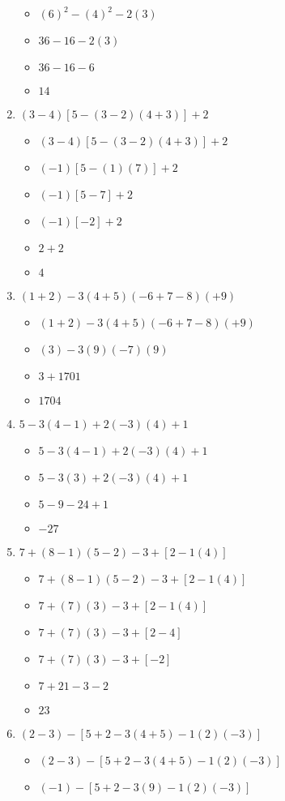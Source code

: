 \documentclass{article}
\begin{document}
\begin{enumerate}
\begin{itemize}
  \item $(6)^{2}-(4)^{2}-2(3)$
  \item $36-16-2(3)$
  \item $36-16-6$
  \item $14$
  \end{itemize}
\item $(3-4)[5-(3-2)(4+3)]+2$
  \begin{itemize}
  \item $(3-4)[5-(3-2)(4+3)]+2$
  \item $(-1)[5-(1)(7)]+2$
  \item $(-1)[5-7]+2$
  \item $(-1)[-2]+2$
  \item $2+2$
  \item $4$
  \end{itemize}
\item $(1+2)-3(4+5)(-6+7-8)(+9)$
  \begin{itemize}
  \item $(1+2)-3(4+5)(-6+7-8)(+9)$
  \item $(3)-3(9)(-7)(9)$
  \item $3+1701$
  \item $1704$
  \end{itemize}
\item $5-3(4-1)+2(-3)(4)+1$
  \begin{itemize}
  \item $5-3(4-1)+2(-3)(4)+1$
  \item $5-3(3)+2(-3)(4)+1$
  \item $5-9-24+1$
  \item $-27$
  \end{itemize}
\item $7+(8-1)(5-2)-3+[2-1(4)]$
  \begin{itemize}
  \item $7+(8-1)(5-2)-3+[2-1(4)]$
  \item $7+(7)(3)-3+[2-1(4)]$
  \item $7+(7)(3)-3+[2-4]$
  \item $7+(7)(3)-3+[-2]$
  \item $7+21-3-2$
  \item $23$
  \end{itemize}
\item $(2-3)-[5+2-3(4+5)-1(2)(-3)]$
  \begin{itemize}
  \item $(2-3)-[5+2-3(4+5)-1(2)(-3)]$
  \item $(-1)-[5+2-3(9)-1(2)(-3)]$

\end{itemize}
\end{enumerate}
\end{document}

